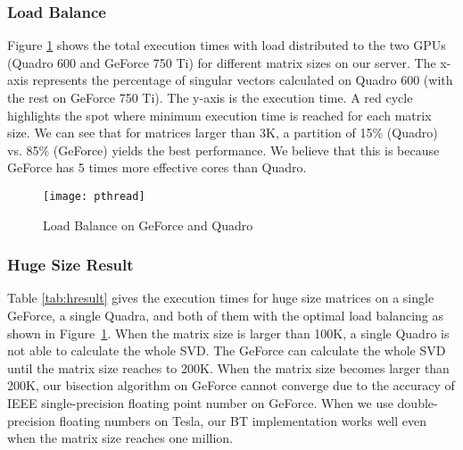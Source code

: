 \subsubsection{Load Balance}
Figure \ref{fig:pthread} shows the total execution times with load distributed to the two GPUs
(Quadro 600 and GeForce 750 Ti) for different matrix sizes on our server.
The x-axis represents the percentage of singular vectors calculated on Quadro 600 (with the rest on GeForce 750 Ti).
The y-axis is the execution time.
A red cycle
highlights the spot where minimum execution time is reached
for each matrix size. We can see that for matrices larger than
3K, a partition of 15\% (Quadro) vs. 85\% (GeForce) yields the
best performance. We believe that this is because 
GeForce has 5 times more effective cores than Quadro.
\begin{figure}[hbpt]
\centering
\texttt{[image: pthread]}
\caption{Load Balance on GeForce and Quadro}
\label{fig:pthread}
\vspace{-0.15in}
\end{figure}
\fi

\subsubsection{Huge Size Result}
Table \ref{tab:hresult} gives the execution times for huge size matrices on a single GeForce, a single Quadra, and both of them with the optimal load balancing as shown in Figure~\ref{fig:pthread}.
When the matrix size is larger than 100K, a single Quadro is not able to calculate the whole SVD.
The GeForce can calculate the whole SVD until the matrix size reaches to 200K.
When the matrix size becomes larger than 200K, our bisection algorithm on GeForce cannot converge due to the accuracy of IEEE single-precision floating point number on GeForce.
When we use double-precision floating numbers on Tesla, our BT implementation works well even when the matrix size reaches one million.

